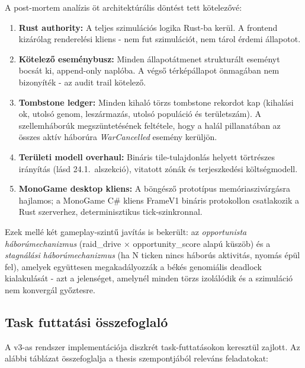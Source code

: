 A post-mortem analízis öt architektúrális döntést tett kötelezővé:

\begin{enumerate}
  \item \textbf{Rust authority:} A teljes szimulációs logika Rust-ba kerül. A frontend kizárólag renderelési kliens - nem fut szimulációt, nem tárol érdemi állapotot.
  \item \textbf{Kötelező eseménybusz:} Minden állapotátmenet strukturált eseményt bocsát ki, append-only naplóba. A végső térképállapot önmagában nem bizonyíték - az audit trail kötelező.
  \item \textbf{Tombstone ledger:} Minden kihaló törzs tombstone rekordot kap (kihalási ok, utolsó genom, leszármazás, utolsó populáció és területszám). A szellemháborúk megszüntetésének feltétele, hogy a halál pillanatában az összes aktív háborúra \textit{WarCancelled} esemény kerüljön.
  \item \textbf{Területi modell overhaul:} Bináris tile-tulajdonlás helyett törtrészes irányítás (lásd 24.1.~alszekció), vitatott zónák és terjeszkedési költségmodell.
  \item \textbf{MonoGame desktop kliens:} A böngésző prototípus memóriaszivárgásra hajlamos; a MonoGame C\# kliens FrameV1 bináris protokollon csatlakozik a Rust szerverhez, determinisztikus tick-szinkronnal.
\end{enumerate}

Ezek mellé két gameplay-szintű javítás is bekerült: az \textit{opportunista háborúmechanizmus} (raid\_drive × opportunity\_score alapú küszöb) és a \textit{stagnálási háborúmechanizmus} (ha N ticken nincs háborús aktivitás, nyomás épül fel), amelyek együttesen megakadályozzák a békés genomiális deadlock kialakulását - azt a jelenséget, amelynél minden törzs izolálódik és a szimuláció nem konvergál győztesre.

\subsection*{Task futtatási összefoglaló}

A v3-as rendszer implementációja diszkrét task-futtatásokon keresztül zajlott. Az alábbi táblázat összefoglalja a thesis szempontjából releváns feladatokat:

